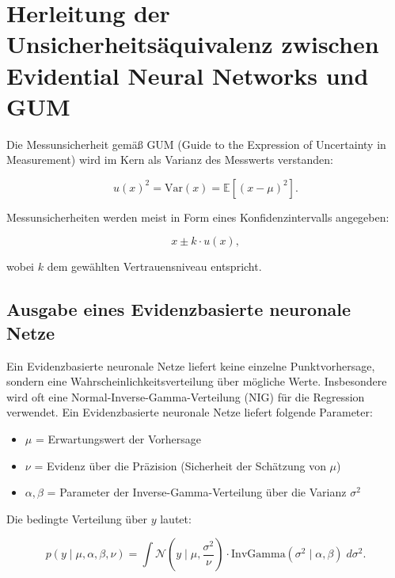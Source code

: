 \pagebreak

\section*{Herleitung der Unsicherheitsäquivalenz zwischen Evidential Neural Networks und GUM}
\label{sec:enn_gum_derivation}

Die Messunsicherheit gemäß GUM (Guide to the Expression of Uncertainty in Measurement) wird im Kern als Varianz des Messwerts verstanden:

\begin{equation}
u(x)^2 = \mathrm{Var}(x) = \mathbb{E}\left[(x - \mu)^2\right].
\end{equation}

Messunsicherheiten werden meist in Form eines Konfidenzintervalls angegeben:

\begin{equation}
x \pm k \cdot u(x),
\end{equation}

wobei $k$ dem gewählten Vertrauensniveau entspricht.

\subsection*{Ausgabe eines \gls{Evidenzbasierte neuronale Netze}}

Ein \gls{Evidenzbasierte neuronale Netze} liefert keine einzelne Punktvorhersage, sondern eine Wahrscheinlichkeitsverteilung über mögliche Werte. Insbesondere wird oft eine Normal-Inverse-Gamma-Verteilung (NIG) für die Regression verwendet. Ein \gls{Evidenzbasierte neuronale Netze} liefert folgende Parameter:

\begin{itemize}
    \item $\mu$ = Erwartungswert der Vorhersage
    \item $\nu$ = Evidenz über die Präzision (Sicherheit der Schätzung von $\mu$)
    \item $\alpha, \beta$ = Parameter der Inverse-Gamma-Verteilung über die Varianz $\sigma^2$
\end{itemize}

Die bedingte Verteilung über $y$ lautet:

\begin{equation}
p(y \mid \mu, \alpha, \beta, \nu) 
=
\int 
\mathcal{N}\left(y \mid \mu, \frac{\sigma^2}{\nu}\right) 
\cdot
\mathrm{InvGamma}(\sigma^2 \mid \alpha, \beta) 
\; d\sigma^2.
\end{equation}

